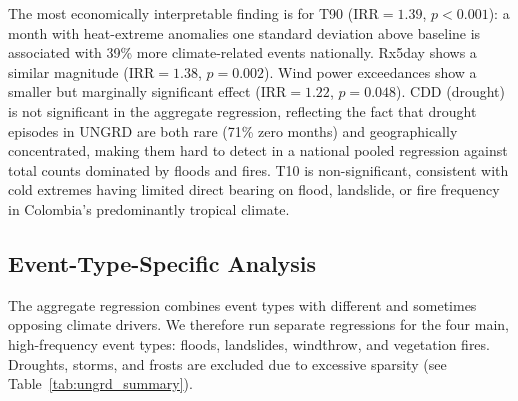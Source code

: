 \documentclass[12pt]{article}
\begin{document}
\medskip
The most economically interpretable finding is for T90 ($\mathrm{IRR}=1.39$, $p<0.001$): a month with heat-extreme anomalies one standard deviation above baseline is associated with 39\% more climate-related events nationally. Rx5day shows a similar magnitude ($\mathrm{IRR}=1.38$, $p=0.002$). Wind power exceedances show a smaller but marginally significant effect ($\mathrm{IRR}=1.22$, $p=0.048$). CDD (drought) is not significant in the aggregate regression, reflecting the fact that drought episodes in UNGRD are both rare (71\% zero months) and geographically concentrated, making them hard to detect in a national pooled regression against total counts dominated by floods and fires. T10 is non-significant, consistent with cold extremes having limited direct bearing on flood, landslide, or fire frequency in Colombia's predominantly tropical climate.

\subsection{Event-Type-Specific Analysis}

The aggregate regression combines event types with different and sometimes opposing climate drivers. We therefore run separate regressions for the four main, high-frequency event types: floods, landslides, windthrow, and vegetation fires. Droughts, storms, and frosts are excluded due to excessive sparsity (see Table~\ref{tab:ungrd_summary}).

\begin{table}[H]
\centering\small
\renewcommand{\arraystretch}{1.2}
\setlength{\tabcolsep}{5pt}
\caption{Incidence rate ratios (IRR $= e^{\hat\beta}$) from separate negative binomial regressions by disaster type with linear time-trend covariate (1998--2022, national level, month fixed effects + trend). Droughts, storms, and frosts omitted due to sparse counts and convergence failures. Nagelkerke $R^2$ per row in parentheses (3-month centred rolling-mean ACI as predictor). Stars: ${}^*p<0.05$, ${}^{**}p<0.01$, ${}^{***}p<0.001$.}
\label{tab:negbin_bytype}
\end{table}
\end{document}
